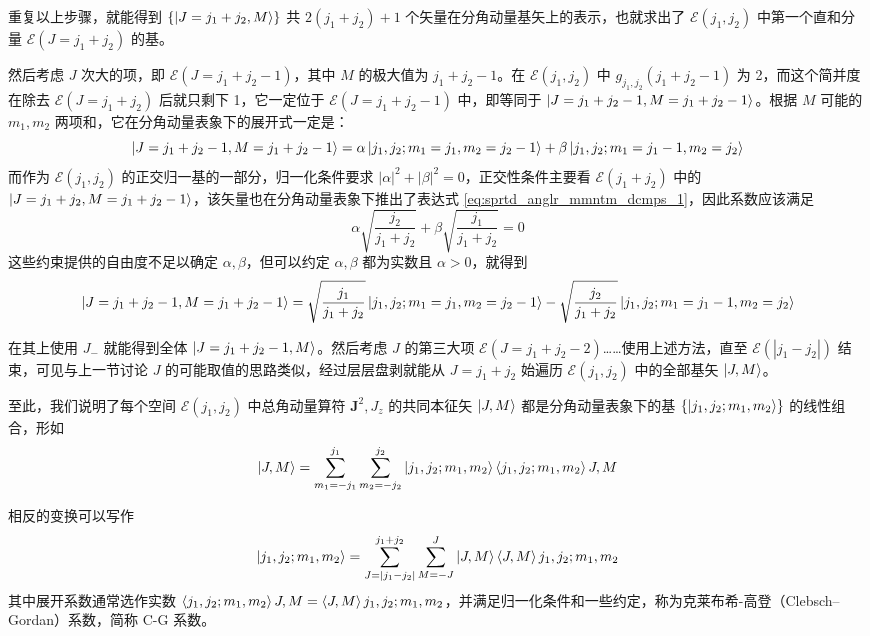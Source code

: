 \documentclass[cn,10pt,math=newtx,citestyle=gb7714-2015,bibstyle=gb7714-2015]{elegantbook}
\def\bm{\boldsymbol}
\def\ms{\mathscr}
\begin{document}
重复以上步骤，就能得到 $\{\ket{J=j_1+j_2,M}\}$ 共 $2(j_1+j_2)+1$ 个矢量在分角动量基矢上的表示，也就求出了 $\ms E(j_1,j_2)$ 中第一个直和分量 $\ms E(J=j_1+j_2)$ 的基。

然后考虑 $J$ 次大的项，即 $\ms E(J=j_1+j_2-1)$，其中 $M$ 的极大值为 $j_1+j_2-1$。在 $\ms E(j_1,j_2)$ 中 $g_{j_1,j_2}(j_1+j_2-1)$ 为 2，而这个简并度在除去 $\ms E(J=j_1+j_2)$ 后就只剩下 1，它一定位于 $\ms E(J=j_1+j_2-1)$ 中，即等同于 $\ket{J=j_1+j_2-1,M=j_1+j_2-1}$。根据 $M$ 可能的 $m_1,m_2$ 两项和，它在分角动量表象下的展开式一定是：
\begin{equation}
    \ket{J=j_1+j_2-1,M=j_1+j_2-1} = \alpha\ket{j_1,j_2;m_1=j_1,m_2=j_2-1}+\beta\ket{j_1,j_2;m_1=j_1-1,m_2=j_2}
\end{equation}
而作为 $\ms E(j_1,j_2)$ 的正交归一基的一部分，归一化条件要求 $|\alpha|^2+|\beta|^2=0$，正交性条件主要看 $\ms E(j_1+j_2)$ 中的 $\ket{J=j_1+j_2,M=j_1+j_2-1}$，该矢量也在分角动量表象下推出了表达式 \ref{eq:sprtd_anglr_mmntm_dcmps_1}，因此系数应该满足
\begin{equation}
    \alpha\sqrt{\frac{j_2}{j_1+j_2}}+\beta\sqrt{\frac{j_1}{j_1+j_2}}=0
\end{equation}
这些约束提供的自由度不足以确定 $\alpha,\beta$，但可以约定 $\alpha,\beta$ 都为实数且 $\alpha>0$，就得到
\begin{equation}
    \ket{J=j_1+j_2-1,M=j_1+j_2-1} =\sqrt{\frac{j_1}{j_1+j_2}}\ket{j_1,j_2;m_1=j_1,m_2=j_2-1}-\sqrt{\frac{j_2}{j_1+j_2}}\ket{j_1,j_2;m_1=j_1-1,m_2=j_2}
\end{equation}

在其上使用 $J_-$ 就能得到全体 $\ket{J = j_1+j_2-1,M}$。然后考虑 $J$ 的第三大项 $\ms E(J=j_1+j_2-2)$……使用上述方法，直至 $\ms E(|j_1-j_2|)$ 结束，可见与上一节讨论 $J$ 的可能取值的思路类似，经过层层盘剥就能从 $J=j_1+j_2$ 始遍历 $\ms E(j_1,j_2)$ 中的全部基矢 $\ket{J,M}$。

\begin{definition}[C-G 系数]
至此，我们说明了每个空间 $\ms E(j_1,j_2)$ 中总角动量算符 $\bm J^2,J_z$ 的共同本征矢 $\ket{J,M}$ 都是分角动量表象下的基 $\{\ket{j_1,j_2;m_1,m_2}\}$ 的线性组合，形如
\begin{equation}
    \ket{J,M} = \sum_{m_1=-j_1}^{j_1}\sum_{m_2=-j_2}^{j_2}\ket{j_1,j_2;m_1,m_2}\braket{j_1,j_2;m_1,m_2}{J,M}
\end{equation}

相反的变换可以写作
\begin{equation}
    \ket{j_1,j_2;m_1,m_2} = \sum_{J=|j_1-j_2|}^{j_1+j_2}\sum_{M=-J}^J\ket{J,M}\braket{J,M}{j_1,j_2;m_1,m_2}
\end{equation}
其中展开系数通常选作实数 $\braket{j_1,j_2;m_1,m_2}{J,M}=\braket{J,M}{j_1,j_2;m_1,m_2}$，并满足归一化条件和一些约定，称为克莱布希-高登（Clebsch–Gordan）系数，简称 C-G 系数。
\end{definition}
\end{document}
